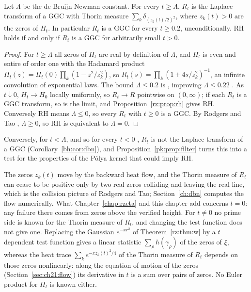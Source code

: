 \begin{theorem}\label{rz:thm:dbn}
Let $\Lambda$ be the de Bruijn Newman constant. For every $t\ge\Lambda$, $R_t$ is the Laplace transform of a GGC with Thorin measure $\sum_k\delta_{(z_k(t)/2)^2}$, where $z_k(t)>0$ are the zeros of $H_t$. In particular $R_t$ is a GGC for every $t\ge0.2$, unconditionally. RH holds if and only if $R_t$ is a GGC for arbitrarily small $t>0$.
\end{theorem}

\begin{proof}
For $t\ge\Lambda$ all zeros of $H_t$ are real by definition of $\Lambda$, and $H_t$ is even and entire of order one with the Hadamard product $H_t(z)=H_t(0)\prod_k(1-z^2/z_k^2)$, so $R_t(s)=\prod_k(1+4s/z_k^2)^{-1}$, an infinite convolution of exponential laws. The bound $\Lambda\le0.2$ is \cite{PT21}, improving $\Lambda\le0.22$ \cite{Polymath}. As $t\downarrow0$, $H_t\to H_0$ locally uniformly, so $R_t\to R$ pointwise on $(0,\infty)$; if each $R_t$ is a GGC transform, so is the limit, and Proposition~\ref{rz:prop:rh} gives RH. Conversely RH means $\Lambda\le0$, so every $R_t$ with $t\ge0$ is a GGC. By Rodgers and Tao \cite{RodgersTao}, $\Lambda\ge0$, so RH is equivalent to $\Lambda=0$.
\end{proof}

Conversely, for $t<\Lambda$, and so for every $t<0$ \cite{RodgersTao}, $R_t$ is not the Laplace transform of a GGC (Corollary~\ref{bh:cor:dbn}), and Proposition~\ref{pk:prop:filter} turns this into a test for the properties of the P\'olya kernel that could imply RH.

The zeros $z_k(t)$ move by the backward heat flow, and the Thorin measure of $R_t$ can cease to be positive only by two real zeros colliding and leaving the real line, which is the collision picture of Rodgers and Tao; Section~\ref{ch:dbn} computes the flow numerically. What Chapter~\ref{chap:rzeta} and this chapter add concerns $t=0$: any failure there comes from zeros above the verified height. For $t\ne0$ no prime side is known for the Thorin measure of $R_t$, and changing the test function does not give one. Replacing the Gaussian $e^{-xr^2}$ of Theorem~\ref{rz:thm:w} by a $t$ dependent test function gives a linear statistic $\sum_\rho h(\gamma_\rho)$ of the zeros of $\xi$, whereas the heat trace $\sum_ke^{-xz_k(t)^2/4}$ of the Thorin measure of $R_t$ depends on those zeros nonlinearly: along the equation of motion of the zeros (Section~\ref{sec:ch21:flow}) its derivative in $t$ is a sum over pairs of zeros. No Euler product for $H_t$ is known either.

